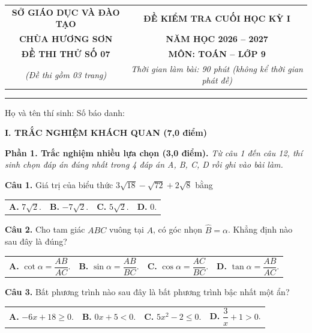 \documentclass[11pt,a4paper]{article}
\begin{document}
\noindent
\begin{tabular*}{\linewidth}{@{\extracolsep{\fill}}cc@{}}
\textbf{SỞ GIÁO DỤC VÀ ĐÀO TẠO} & \textbf{ĐỀ KIỂM TRA CUỐI HỌC KỲ I} \\
\textbf{CHÙA HƯƠNG SƠN} & \textbf{NĂM HỌC 2026 -- 2027} \\
\textbf{ĐỀ THI THỬ SỐ 07} & \textbf{MÔN: TOÁN -- LỚP 9} \\
\textit{(Đề thi gồm 03 trang)} & \textit{Thời gian làm bài: 90 phút (không kể thời gian phát đề)} \\
\end{tabular*}

\vspace{2mm}
\noindent
\rule{\linewidth}{0.8pt}

\vspace{1mm}
\noindent
Họ và tên thí sinh: \dotfill Số báo danh: \dotfill

\vspace{2mm}
\noindent
\textbf{\large I. TRẮC NGHIỆM KHÁCH QUAN (7,0 điểm)}

\vspace{1mm}
\noindent
\textbf{Phần 1. Trắc nghiệm nhiều lựa chọn (3,0 điểm).} \textit{Từ câu 1 đến câu 12, thí sinh chọn đáp án đúng nhất trong 4 đáp án A, B, C, D rồi ghi vào bài làm.}

\vspace{1.5mm}
\textbf{Câu 1.} Giá trị của biểu thức $3\sqrt{18} - \sqrt{72} + 2\sqrt{8}$ bằng\\
\begin{tabularx}{\linewidth}{XXXX}
\textbf{A.} $7\sqrt{2}$. & \textbf{B.} $-7\sqrt{2}$. & \textbf{C.} $5\sqrt{2}$. & \textbf{D.} $0$.
\end{tabularx}

\vspace{1.5mm}
\textbf{Câu 2.} Cho tam giác $ABC$ vuông tại $A$, có góc nhọn $\widehat{B} = \alpha$. Khẳng định nào sau đây là đúng?\\
\begin{tabularx}{\linewidth}{XXXX}
\textbf{A.} $\cot \alpha = \dfrac{AB}{AC}$. & \textbf{B.} $\sin \alpha = \dfrac{AB}{BC}$. & \textbf{C.} $\cos \alpha = \dfrac{AC}{BC}$. & \textbf{D.} $\tan \alpha = \dfrac{AB}{AC}$.
\end{tabularx}

\vspace{1.5mm}
\textbf{Câu 3.} Bất phương trình nào sau đây là bất phương trình bậc nhất một ẩn?\\
\begin{tabularx}{\linewidth}{XXXX}
\textbf{A.} $-6x + 18 \ge 0$. & \textbf{B.} $0x + 5 < 0$. & \textbf{C.} $5x^2 - 2 \le 0$. & \textbf{D.} $\dfrac{3}{x} + 1 > 0$.
\end{tabularx}
\end{document}
